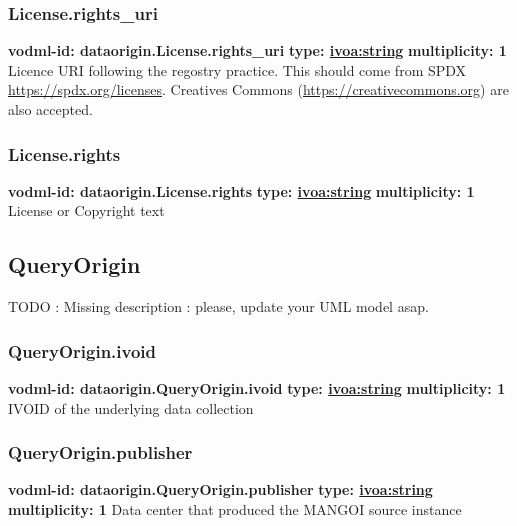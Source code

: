    \subsubsection{License.rights_uri}
      \textbf{vodml-id: dataorigin.License.rights_uri} \newline
      \textbf{type: \hyperref[sect:ivoa]{ivoa:string}} \newline
      \textbf{multiplicity: 1} \newline
      Licence URI following the regostry practice. This should come from SPDX \url{https://spdx.org/licenses}. Creatives Commons (\url{https://creativecommons.org}) are also accepted.

    \subsubsection{License.rights}
      \textbf{vodml-id: dataorigin.License.rights} \newline
      \textbf{type: \hyperref[sect:ivoa]{ivoa:string}} \newline
      \textbf{multiplicity: 1} \newline
      License or Copyright text

  \subsection{QueryOrigin}
  \label{sect:dataorigin.QueryOrigin}
    TODO : Missing description : please, update your UML model asap.

    \subsubsection{QueryOrigin.ivoid}
      \textbf{vodml-id: dataorigin.QueryOrigin.ivoid} \newline
      \textbf{type: \hyperref[sect:ivoa]{ivoa:string}} \newline
      \textbf{multiplicity: 1} \newline
      IVOID of the underlying data collection

    \subsubsection{QueryOrigin.publisher}
      \textbf{vodml-id: dataorigin.QueryOrigin.publisher} \newline
      \textbf{type: \hyperref[sect:ivoa]{ivoa:string}} \newline
      \textbf{multiplicity: 1} \newline
      Data center that produced the MANGOI source instance

